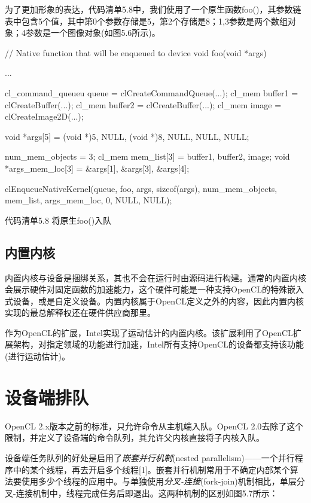 为了更加形象的表达，代码清单5.8中，我们使用了一个原生函数foo()，其参数链表中包含5个值，其中第0个参数存储是5，第2个存储是8；1,3参数是两个数组对象；4参数是一个图像对象(如图5.6所示)。

\begin{codebox}[cpp]
// Native function that will be enqueued to device
void foo(void *args){

  ...
}

cl_command_queueu queue = clCreateCommandQueue(...);
cl_mem buffer1 = clCreateBuffer(...);
cl_mem buffer2 = clCreateBuffer(...);
cl_mem image = clCreateImage2D(...);

void *args[5] = {(void *)5, NULL, (void *)8, NULL, NULL, NULL};

num_mem_objects = 3;
cl_mem mem_list[3] = {buffer1, buffer2, image};
void *args_mem_loc[3] = {&args[1], &args[3], &args[4]};

clEnqueueNativeKernel(queue, foo, args, sizeof(args), num_mem_objects, mem_list, args_mem_loc, 0, NULL, NULL);
\end{codebox}

代码清单5.8 将原生foo()入队


\subsection{内置内核}

内置内核与设备是捆绑关系，其也不会在运行时由源码进行构建。通常的内置内核会展示硬件对固定函数的加速能力，这个硬件可能是一种支持OpenCL的特殊嵌入式设备，或是自定义设备。内置内核属于OpenCL定义之外的内容，因此内置内核实现的最总解释权还在硬件供应商那里。

作为OpenCL的扩展，Intel实现了运动估计的内置内核。该扩展利用了OpenCL扩展架构，对指定领域的功能进行加速，Intel所有支持OpenCL的设备都支持该功能(进行运动估计)。



\section{设备端排队}

OpenCL 2.x版本之前的标准，只允许命令从主机端入队。OpenCL 2.0去除了这个限制，并定义了设备端的命令队列，其允许父内核直接将子内核入队。

设备端任务队列的好处是启用了\emph{嵌套并行机制}(nested parallelism)——一个并行程序中的某个线程，再去开启多个线程[1]。嵌套并行机制常用于不确定内部某个算法要使用多少个线程的应用中。与单独使用\emph{分叉-连接}(fork-join)机制相比，单层分叉-连接机制中，线程完成任务后即退出。这两种机制的区别如图5.7所示：

